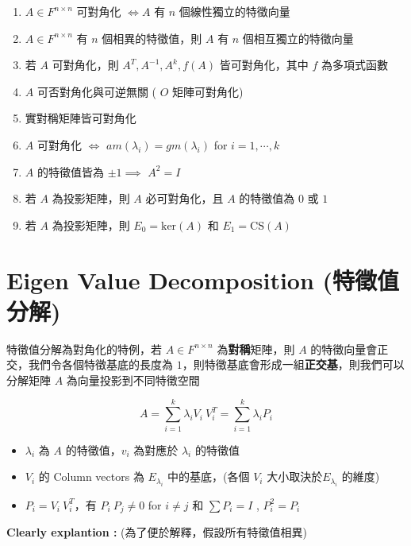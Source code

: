 \documentclass[
]{book}
\providecommand{\tightlist}{%
  \setlength{\itemsep}{0pt}\setlength{\parskip}{0pt}}
\begin{document}
\begin{enumerate}
\def\labelenumi{\arabic{enumi}.}
\tightlist
\item
  \(A \in F^{n\times n}\) 可對角化 \(\iff A\) 有 \(n\) 個線性獨立的特徵向量
\item
  \(A \in F^{n\times n}\) 有 \(n\) 個相異的特徵值，則 \(A\) 有 \(n\) 個相互獨立的特徵向量
\item
  若 \(A\) 可對角化，則 \(A^T, A^{-1}, A^k, f(A)\) 皆可對角化，其中 \(f\) 為多項式函數
\item
  \(A\) 可否對角化與可逆無關 ( \(O\) 矩陣可對角化)
\item
  實對稱矩陣皆可對角化
\item
  \(A\) 可對角化 \(\iff\) \(am(\lambda_i) = gm(\lambda_i)\) for \(i = 1,\cdots,k\)
\item
  \(A\) 的特徵值皆為 \(\pm 1 \implies\) \(A^2 = I\)
\item
  若 \(A\) 為投影矩陣，則 \(A\) 必可對角化，且 \(A\) 的特徵值為 \(0\) 或 \(1\)
\item
  若 \(A\) 為投影矩陣，則 \(E_{0} = \mbox{ker}(A)\) 和 \(E_{1} = \mbox{CS}(A)\)
\end{enumerate}

\hypertarget{eigen-value-decomposition-ux7279ux5fb5ux503cux5206ux89e3}{%
\section{Eigen Value Decomposition (特徵值分解)}\label{eigen-value-decomposition-ux7279ux5fb5ux503cux5206ux89e3}}

特徵值分解為對角化的特例，若 \(A \in F^{n\times n}\) 為\textbf{對稱}矩陣，則 \(A\) 的特徵向量會正交，我們令各個特徵基底的長度為 \(1\)，則特徵基底會形成一組\textbf{正交基}，則我們可以分解矩陣 \(A\) 為向量投影到不同特徵空間

\[
A = \sum_{i=1}^k\lambda_i V_i\ V_i^T = \sum_{i = 1}^k\lambda_i P_i
\]

\begin{itemize}
\tightlist
\item
  \(\lambda_i\) 為 \(A\) 的特徵值，\(v_i\) 為對應於 \(\lambda_i\) 的特徵值
\item
  \(V_i\) 的 Column vectors 為 \(E_{\lambda_i}\) 中的基底，(各個 \(V_i\) 大小取決於\(E_{\lambda_i}\) 的維度)
\item
  \(P_i = V_i\ V_i^T\)，有 \(P_i \ P_j \neq 0\) for \(i \neq j\) 和 \(\sum P_i = I\) , \(P_i^2 = P_i\)
\end{itemize}

\textbf{Clearly explantion :} (為了便於解釋，假設所有特徵值相異)
\end{document}
